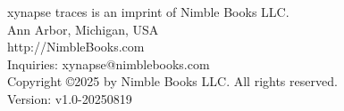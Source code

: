 
\newpage
\thispagestyle{empty}
\vspace*{1in}
\begin{center}
\large
xynapse traces is an imprint of Nimble Books LLC.\\
Ann Arbor, Michigan, USA \\
http://NimbleBooks.com \\
Inquiries: xynapse@nimblebooks.com \\[2em]
Copyright \copyright 2025 by Nimble Books LLC. All rights reserved.\\[2em]

Version: v1.0-20250819
\end{center}
\cleardoublepage
